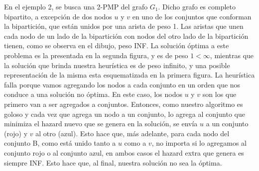 \documentclass[11pt, a4paper, twoside]{article}
\begin{document}
\begin{enumerate}
		
		En el ejemplo 2, se busca una 2-PMP del grafo $G_{1}$.  Dicho grafo es completo bipartito,
		a excepción de dos nodos $u$ y $v$ en uno de los conjuntos que conforman la bipartición, que están unidos por una
		arista de peso 1. Las aristas que unen cada nodo de un lado de la bipartición con nodos del otro lado de la 
		bipartición tienen, como se observa en el dibujo, peso INF. 
		La solución óptima a este problema es la presentada en la segunda
		figura, y es de peso $1 < \infty$, mientras que la solución que brinda nuestra heurística es de peso
		infinito, y una posible representación de la misma esta esquematizada en la primera figura. 
		La heurística falla
		porque vamos agregando los nodos a cada conjunto en un orden que nos conduce a una solución no óptima. En este caso,
		los nodos $u$ y $v$ son los que primero van a ser agregados a conjuntos. Entonces, como nuestro algoritmo
		es goloso y cada vez que agrega un nodo a un conjunto, lo agrega al conjunto que minimiza el hazard nuevo que se
		genera en la solución, se envía $u$ a un conjunto (rojo) y $v$ al otro (azul). Esto hace que, más adelante, para 
		cada nodo del conjunto B, como está unido tanto a $u$ como a $v$, 
		no importa si lo agregamos al conjunto rojo o al conjunto azul, en ambos casos el hazard extra que genera
	    es siempre INF. Esto hace que, al final, nuestra solución no sea la óptima. \\
	    

\end{enumerate}
\end{document}
